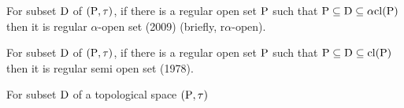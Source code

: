 \begin{dfn}\label{dfn1.2.6}
For  subset $\mathrm{D}$ of $(\mathrm{P}, \tau)$, if there is a regular open set $\mathrm{P}$ such that $\mathrm{P} \subseteq \mathrm{D} \subseteq \alpha \mathrm{cl}(\mathrm{P})$ then it is regular $\alpha$-open set (2009) (briefly, r$\alpha$-open).
\end{dfn}

\begin{dfn}\label{dfn1.2.7}
For  subset $\mathrm{D}$ of $(\mathrm{P}, \tau)$, if there is a regular open set $\mathrm{P}$ such that $\mathrm{P} \subseteq \mathrm{D} \subseteq \mathrm{cl}(\mathrm{P})$ then it is regular semi open set (1978).  
\end{dfn}

\begin{dfn}\label{dfn1.2.8}
For subset $\mathrm{D}$ of a topological space $(\mathrm{P}, \tau)$ 
\end{dfn}

